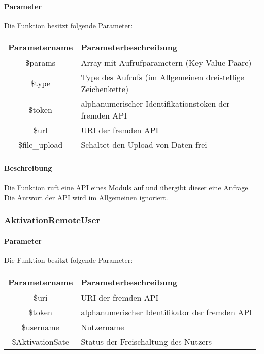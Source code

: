 \paragraph{Parameter} Die Funktion besitzt folgende Parameter:
\begin{table}[H]
	\begin{tabular}{|c|p{11cm}|}
		\hline
		\textbf{Parametername} & \textbf{Parameterbeschreibung} \\ \hline
		\$params       & Array mit Aufrufparametern (Key-Value-Paare) \\ \hline
		\$type         & Type des Aufrufs (im Allgemeinen dreistellige Zeichenkette) \\ \hline
		\$token        & alphanumerischer Identifikationstoken der fremden API \\ \hline
		\$url          & URI der fremden API \\ \hline
		\$file\_upload & Schaltet den Upload von Daten frei \\ \hline
	\end{tabular}
\end{table}
\paragraph{Beschreibung} Die Funktion ruft eine API eines Moduls auf und übergibt dieser eine Anfrage. Die Antwort der API wird im Allgemeinen ignoriert.
\subsubsection{AktivationRemoteUser}
\paragraph{Parameter} Die Funktion besitzt folgende Parameter:
\begin{table}[H]
	\begin{tabular}{|c|p{11cm}|}
		\hline
		\textbf{Parametername} & \textbf{Parameterbeschreibung} \\ \hline
		\$uri            & URI der fremden API \\ \hline
		\$token          & alphanumerischer Identifikator der fremden API \\ \hline
		\$username       & Nutzername \\ \hline
		\$AktivationSate & Status der Freischaltung des Nutzers \\ \hline
	\end{tabular}
\end{table}
